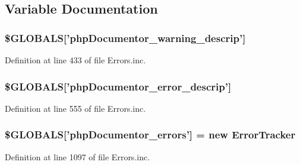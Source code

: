 \subsection{\-Variable \-Documentation}
\hypertarget{_errors_8inc_a08f81ef82ac26fe71d888b4f0296bf60}{
\subsubsection[{\$\-G\-L\-O\-B\-A\-L\-S}]{\setlength{\rightskip}{0pt plus 5cm}\$\-G\-L\-O\-B\-A\-L\-S\mbox{[}'php\-Documentor\-\_\-warning\-\_\-descrip'\mbox{]}}}\label{_errors_8inc_a08f81ef82ac26fe71d888b4f0296bf60}


\-Definition at line 433 of file \-Errors.\-inc.

\hypertarget{_errors_8inc_a1a05102bea2aea0b0e15d2f1e7329e0d}{
\subsubsection[{\$\-G\-L\-O\-B\-A\-L\-S}]{\setlength{\rightskip}{0pt plus 5cm}\$\-G\-L\-O\-B\-A\-L\-S\mbox{[}'php\-Documentor\-\_\-error\-\_\-descrip'\mbox{]}}}\label{_errors_8inc_a1a05102bea2aea0b0e15d2f1e7329e0d}


\-Definition at line 555 of file \-Errors.\-inc.

\hypertarget{_errors_8inc_a080e07365a9161ab4c9d6375d03809f0}{
\subsubsection[{\$\-G\-L\-O\-B\-A\-L\-S}]{\setlength{\rightskip}{0pt plus 5cm}\$\-G\-L\-O\-B\-A\-L\-S\mbox{[}'php\-Documentor\-\_\-errors'\mbox{]} = new {\bf \-Error\-Tracker}}}\label{_errors_8inc_a080e07365a9161ab4c9d6375d03809f0}


\-Definition at line 1097 of file \-Errors.\-inc.


